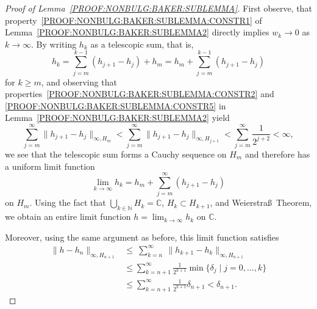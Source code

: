 \documentclass[a4paper, 12pt, twoside]{amsart}
\theoremstyle{definition}
\numberwithin{equation}{section}
\newcommand{\C}{{\mathbb C}}
\newcommand{\N}{{\mathbb N}}
\begin{document}
\begin{proof}[Proof of Lemma~\ref{PROOF:NONBULG:BAKER:SUBLEMMA}]
        First observe, that property~\eqref{PROOF:NONBULG:BAKER:SUBLEMMA:CONSTR1} of Lemma~\ref{PROOF:NONBULG:BAKER:SUBLEMMA2} directly implies $w_k \to 0$ as $k \to \infty$. 
        By writing $h_k$ as a telescopic sum, that is,
        \begin{equation*}
            h_k = \sum_{j = m}^{k - 1} (h_{j + 1} - h_{j}) + h_m = h_m +  \sum_{j = m}^{k-1} \left(h_{j + 1} - h_{j}\right)
        \end{equation*}
        for $k \geq m$, and observing that properties~\eqref{PROOF:NONBULG:BAKER:SUBLEMMA:CONSTR2} and \eqref{PROOF:NONBULG:BAKER:SUBLEMMA:CONSTR5} in Lemma~\ref{PROOF:NONBULG:BAKER:SUBLEMMA2} yield
        \begin{equation*}
            \sum_{j = m}^{\infty} \|{h_{j + 1} - h_{j}}\|_{\infty, H_m} < \sum_{j = m}^{\infty} \|{h_{j + 1} - h_{j}}\|_{\infty, H_{j+1}} < \sum_{j = m}^{\infty} \frac{1}{2^{j+2}} < \infty,
        \end{equation*}
        we see that the telescopic sum forms a Cauchy sequence on $H_m$ and therefore has a uniform limit function 
        \begin{equation*}
            \lim_{k \to \infty} h_k = h_m + \sum_{j = m}^{\infty} (h_{j + 1} - h_{j})
        \end{equation*}
        on $H_m$. 
        Using the fact that $\bigcup_{k\in\N}H_k = \C$, $H_k \subset H_{k+1}$, and Weierstra\ss~Theorem, we obtain an entire limit function $h = \lim_{k\to \infty}h_k$ on $\C$. 

        Moreover, using the same argument as before, this limit function satisfies
        \begin{equation}\label{PROOF:NONBULG:BAKER:EQ2}
            \begin{split}
                \|{h - h_n}\|_{\infty, H_{n+1}} &\leq \ \sum_{k = n}^{\infty} \ \|{h_{k + 1} - h_{k}}\|_{\infty, H_{n+1}} \\
                &\leq \sum_{k = n+1}^{\infty} \frac{1}{2^{k+1}} \min\{\delta_j\mid j = 0, \dots, k\} \\
                &\leq \sum_{k = n+1}^{\infty} \frac{1}{2^{k+1}} \delta_{n+1} < \delta_{n+1}.
            \end{split}
        \end{equation}


\end{proof}
\end{document}
